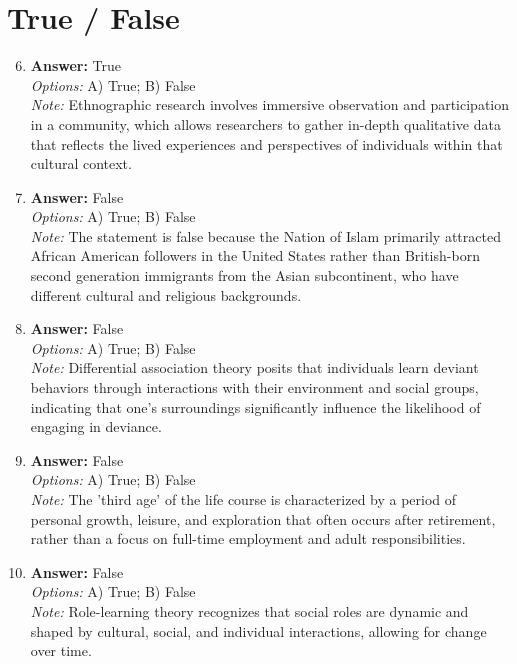 \documentclass[12pt]{article}
\begin{document}
\section*{True / False}
\begin{enumerate}[label=\arabic*.]
\setcounter{enumi}{5}
\item \textbf{Answer:} True
\\ \textit{Options:} A) True; B) False
\\ \textit{Note:} Ethnographic research involves immersive observation and participation in a community, which allows researchers to gather in-depth qualitative data that reflects the lived experiences and perspectives of individuals within that cultural context.
\item \textbf{Answer:} False
\\ \textit{Options:} A) True; B) False
\\ \textit{Note:} The statement is false because the Nation of Islam primarily attracted African American followers in the United States rather than British-born second generation immigrants from the Asian subcontinent, who have different cultural and religious backgrounds.
\item \textbf{Answer:} False
\\ \textit{Options:} A) True; B) False
\\ \textit{Note:} Differential association theory posits that individuals learn deviant behaviors through interactions with their environment and social groups, indicating that one's surroundings significantly influence the likelihood of engaging in deviance.
\item \textbf{Answer:} False
\\ \textit{Options:} A) True; B) False
\\ \textit{Note:} The 'third age' of the life course is characterized by a period of personal growth, leisure, and exploration that often occurs after retirement, rather than a focus on full-time employment and adult responsibilities.
\item \textbf{Answer:} False
\\ \textit{Options:} A) True; B) False
\\ \textit{Note:} Role-learning theory recognizes that social roles are dynamic and shaped by cultural, social, and individual interactions, allowing for change over time.
\end{enumerate}
\end{document}

